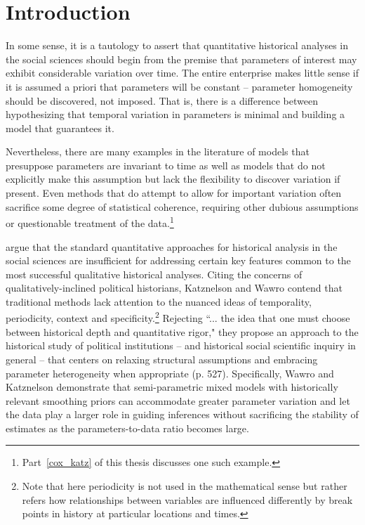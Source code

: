 \chapter{Introduction}
\label{introduction}

In some sense, it is a tautology to assert that quantitative historical analyses in the social sciences should begin from the premise that parameters of interest may exhibit considerable variation over time. The entire enterprise makes little sense if it is assumed a priori that parameters will be constant -- parameter homogeneity should be discovered, not imposed. That is, there is a difference between hypothesizing that temporal variation in parameters is minimal and building a model that guarantees it. 

Nevertheless, there are many examples in the literature of models that presuppose parameters are invariant to time as well as models that do not explicitly make this assumption but lack the flexibility to discover variation if present.  Even methods that do attempt to allow for important variation often sacrifice some degree of statistical coherence, requiring other dubious assumptions or questionable treatment of the data.\footnote{Part~\ref{cox_katz} of this thesis discusses one such example.}

 argue that the standard quantitative approaches for historical analysis in the social sciences are insufficient for addressing certain key features common to the most successful qualitative historical analyses. Citing the concerns of qualitatively-inclined political historians, Katznelson and Wawro contend that traditional methods lack attention to the nuanced ideas of temporality, periodicity, context and specificity.\footnote{Note that here periodicity is not used in the mathematical sense but rather refers how relationships between variables are influenced differently by break points in history at particular locations and times.}  Rejecting ``... the idea that one must choose between historical depth and quantitative rigor," they propose an approach to the historical study of political institutions -- and historical social scientific inquiry in general --  that centers on relaxing structural assumptions and embracing  parameter heterogeneity when appropriate (p. 527). Specifically, Wawro and Katznelson demonstrate that semi-parametric mixed models with historically relevant smoothing priors can accommodate greater parameter variation and let the data play a larger role in guiding inferences without sacrificing the stability of estimates as the parameters-to-data ratio becomes large.  

